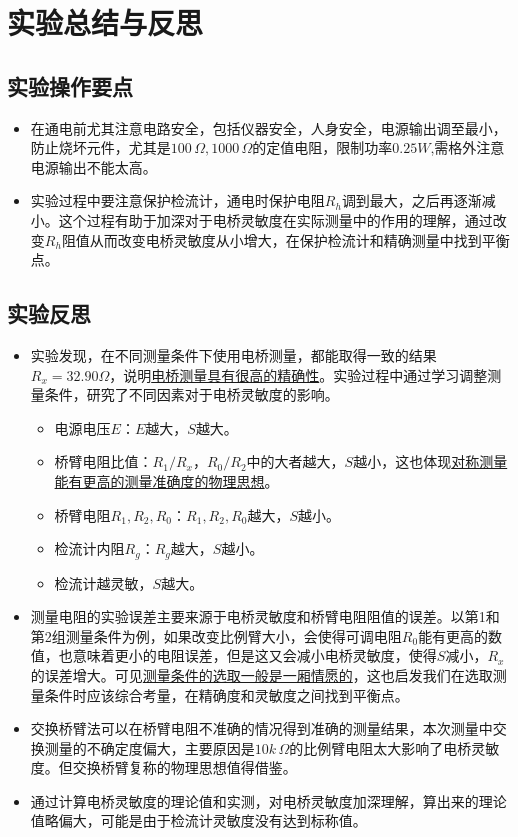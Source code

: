 \documentclass[12pt]{article}
\begin{document}
\section{实验总结与反思}
\subsection{实验操作要点}
\begin{itemize}
    \item 在通电前尤其注意电路安全，包括仪器安全，人身安全，电源输出调至最小，防止烧坏元件，尤其是$100\,\Omega,1000\,\Omega$的定值电阻，限制功率$0.25W$,需格外注意电源输出不能太高。
    \item 实验过程中要注意保护检流计，通电时保护电阻$R_h$调到最大，之后再逐渐减小。这个过程有助于加深对于电桥灵敏度在实际测量中的作用的理解，通过改变$R_h$阻值从而改变电桥灵敏度从小增大，在保护检流计和精确测量中找到平衡点。
\end{itemize}
\subsection{实验反思}
\begin{itemize}
    \item 实验发现，在不同测量条件下使用电桥测量，都能取得一致的结果$R_x=32.90\Omega$，说明\underline{电桥测量具有很高的精确性}。实验过程中通过学习调整测量条件，研究了不同因素对于电桥灵敏度的影响。
    \begin{itemize}
        \item 电源电压$E$：$E$越大，$S$越大。
        \item 桥臂电阻比值：$R_1/R_x，R_0/R_2$中的大者越大，$S$越小，这也体现\underline{对称测量能有更高的测量准确度的物理思想}。
        \item 桥臂电阻$R_1,R_2,R_0$：$R_1,R_2,R_0$越大，$S$越小。
        \item 检流计内阻$R_g$：$R_g$越大，$S$越小。
        \item 检流计越灵敏，$S$越大。
    \end{itemize}
    \item 测量电阻的实验误差主要来源于电桥灵敏度和桥臂电阻阻值的误差。以第1和第2组测量条件为例，如果改变比例臂大小，会使得可调电阻$R_0$能有更高的数值，也意味着更小的电阻误差，但是这又会减小电桥灵敏度，使得$S$减小，$R_x$的误差增大。可见\underline{测量条件的选取一般是一厢情愿的}，这也启发我们在选取测量条件时应该综合考量，在精确度和灵敏度之间找到平衡点。
    \item 交换桥臂法可以在桥臂电阻不准确的情况得到准确的测量结果，本次测量中交换测量的不确定度偏大，主要原因是$10k\,\Omega$的比例臂电阻太大影响了电桥灵敏度。但交换桥臂复称的物理思想值得借鉴。
    \item 通过计算电桥灵敏度的理论值和实测，对电桥灵敏度加深理解，算出来的理论值略偏大，可能是由于检流计灵敏度没有达到标称值。
\end{itemize}
\end{document}
